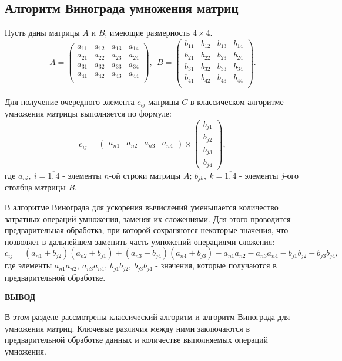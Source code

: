 \subsection{Алгоритм Винограда умножения матриц}

Пусть даны матрицы $A$ и  $B$, имеющие размерность  $4\times 4$.
\begin{equation}
    A = 
\begin{pmatrix}
    a_{11} & a_{12} & a_{13} & a_{14} \\
    a_{21} & a_{22} & a_{23} & a_{24} \\
    a_{31} & a_{32} & a_{33} & a_{34} \\
    a_{41} & a_{42} & a_{43} & a_{44} \\
\end{pmatrix}, \ \
    B = 
\begin{pmatrix}
    b_{11} & b_{12} & b_{13} & b_{14} \\
    b_{21} & b_{22} & b_{23} & b_{24} \\
    b_{31} & b_{32} & b_{33} & b_{34} \\
    b_{41} & b_{42} & b_{43} & b_{44} \\
\end{pmatrix}.
\end{equation}

Для получение очередного элемента $c_{ij}$ матрицы $C$ в классическом
алгоритме умножения матрицы выполняется по формуле:
\begin{equation}
    c_{ij} = \begin{pmatrix} a_{n1} & a_{n2} & a_{n3} & a_{n4} \end{pmatrix} 
    \times 
    \begin{pmatrix} b_{j1}\\ b_{j2}\\ b_{j3}\\ b_{j4} \end{pmatrix},
\end{equation}
где $a_{ni}, \ i = \overline{1,4}$ - элементы $n$-ой строки матрицы  $A$;
$b_{jk}, \ k = \overline{1,4}$ - элементы $j$-ого столбца матрицы  $B$.

В алгоритме Винограда для ускорения вычислений уменьшается количество затратных операций умножения, заменяя их сложениями. Для этого проводится предварительная обработка, при которой сохраняются некоторые значения, что позволяет в дальнейшем заменить часть умножений операциями сложения:
\begin{equation}
    c_{ij} = (a_{n1} + b_{j2}) (a_{n2} + b_{j1})
    + (a_{n3} + b_{j4})(a_{n4} + b_{j 3})
    - a_{n 1}a_{n 2} - a_{n 3}a_{n 4} - b_{j 1}b_{j 2} - b_{j 3}b_{j 4},
\end{equation}
где элементы $a_{n 1}a_{n 2}, \ a_{n 3}a_{n 4}, \ b_{j 1}b_{j 2}, \ b_{j 3}b_{j 4}$ - значения,
которые получаются в предварительной обработке.

\vspace{5mm}

\textbf{ВЫВОД}

В этом разделе рассмотрены классический алгоритм и алгоритм Винограда для умножения матриц. Ключевые различия между ними заключаются в предварительной обработке данных и количестве выполняемых операций умножения.